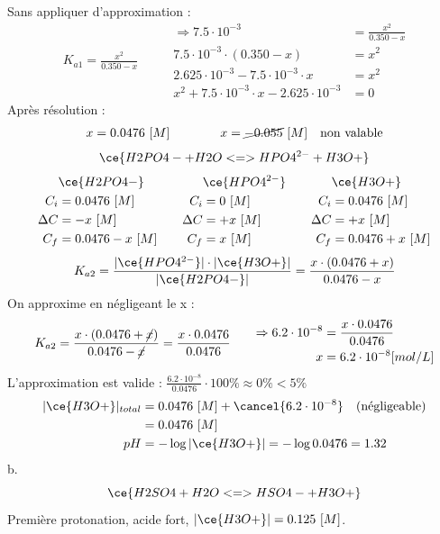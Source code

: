 \documentclass[
  11pt,
  a4paper,
  openany]{book}
\begin{document}
\begin{Answer}
Sans appliquer d'approximation :
\[
\begin{split}
K_{a1} = \frac{x^2}{0.350-x}
\end{split}
\qquad
\begin{split}
\Rightarrow 7.5 \cdot 10^{-3} &= \frac{x^2}{0.350-x} \\
7.5 \cdot 10^{-3} \cdot (0.350-x) &= x^2 \\
2.625 \cdot 10^{-3} - 7.5 \cdot 10^{-3} \cdot x &= x^2 \\
x^2 + 7.5 \cdot 10^{-3} \cdot x - 2.625 \cdot 10^{-3} &= 0
\end{split}
\]
Après résolution :
\[
\begin{split}
x = 0.0476\ [M]
\end{split}
\qquad\qquad
\begin{split}
x = \cancel{-0.055}\ [M] \quad \text{non valable}
\end{split}
\]
\[
\ce{H2PO4- + H2O <=> HPO4^{2-} + H3O+}
\]
\[
\begin{split}
&\ce{H2PO4-}\\
C_i &= 0.0476\ [M] \\
\Delta C &= - x\ [M] \\
C_f &= 0.0476 - x\ [M] \\
\end{split}
\qquad
\begin{split}
&\ce{HPO4^{2-}}\\
C_i &= 0\ [M] \\
\Delta C &= + x\ [M] \\
C_f &= x\ [M] \\
\end{split}
\qquad
\begin{split}
&\ce{H3O+}\\
C_i &= 0.0476\ [M] \\
\Delta C &= + x\ [M] \\
C_f &= 0.0476 + x\ [M] \\
\end{split}
\]
\[
K_{a2} = \frac{|\ce{HPO4^{2-}}| \cdot |\ce{H3O+}|}{|\ce{H2PO4-}|} = \frac{x \cdot (0.0476 + x)}{0.0476 - x}
\]
On approxime en négligeant le x :
\[
\begin{split}
K_{a2} = \frac{x \cdot (0.0476 + \cancel{x})}{0.0476 - \cancel{x}} = \frac{x \cdot 0.0476}{0.0476}
\end{split}
\qquad
\begin{split}
\Rightarrow 6.2 \cdot 10^{-8} &= \frac{x \cdot 0.0476}{0.0476} \\
x &= 6.2 \cdot 10^{-8} [mol/L]
\end{split}
\]
L'approximation est valide : \(\frac{6.2 \cdot 10^{-8}}{0.0476} \cdot 100\% \approx 0\% < 5\%\)
\[
\begin{split}
|\ce{H3O+}|_{total} &= 0.0476\ [M] + \cancel{6.2 \cdot 10^{-8}} \quad \text{(négligeable)} \\
&= 0.0476\ [M] \\
pH &= - \log |\ce{H3O+}| = - \log 0.0476 = 1.32
\end{split}
\]
b. \[
\ce{H2SO4 + H2O <=> HSO4- + H3O+}
\]
Première protonation, acide fort, \(|\ce{H3O+}| = 0.125\ [M]\).


\end{Answer}
\end{document}
